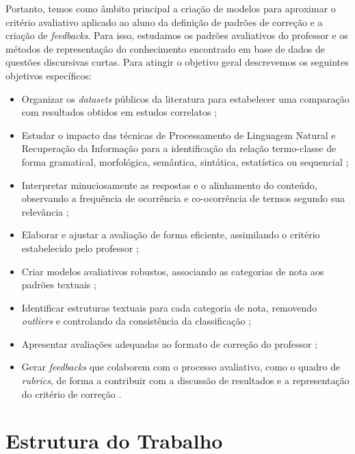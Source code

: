 Portanto, temos como âmbito principal a criação de modelos para aproximar o critério avaliativo aplicado ao aluno da definição de padrões de correção e a criação de \textit{feedbacks}. Para isso, estudamos os padrões avaliativos do professor e os métodos de representação do conhecimento encontrado em base de dados de questões discursivas curtas. Para atingir o objetivo geral descrevemos os seguintes objetivos específicos:

\begin{itemize}
\item Organizar os \textit{datasets} públicos da literatura para estabelecer uma comparação com resultados obtidos em estudos correlatos \cite{burrows2015};
\item Estudar o impacto das técnicas de Processamento de Linguagem Natural e Recuperação da Informação para a identificação da relação termo-classe de forma gramatical, morfológica, semântica, sintática, estatística ou sequencial \cite{galhardi2018a, kumar2019, sahu2020};
\item Interpretar minuciosamente as respostas e o alinhamento do conteúdo, observando a frequência de ocorrência e co-ocorrência de termos segundo sua relevância \cite{jordan2012, saha2018, ding2020};
\item Elaborar e ajustar a avaliação de forma eficiente, assimilando o critério estabelecido pelo professor \cite{zesch2015, condor2020, pado2021};
\item Criar modelos avaliativos robustos, associando as categorias de nota aos padrões textuais \cite{butcher2010, heilman2015, burrows2015};
\item Identificar estruturas textuais para cada categoria de nota, removendo \textit{outliers} e controlando da consistência da classificação \cite{ding2020, filighera2020};
\item Apresentar avaliações adequadas ao formato de correção do professor \cite{higgins2014, funayama2020, pado2021};
\item Gerar \textit{feedbacks} que colaborem com o processo avaliativo, como o quadro de \textit{rubrics}, de forma a contribuir com a discussão de resultados e a representação do critério de correção \cite{marvaniya2018, mizumoto2019, suzen2020}.
\end{itemize}

\section{Estrutura do Trabalho}

